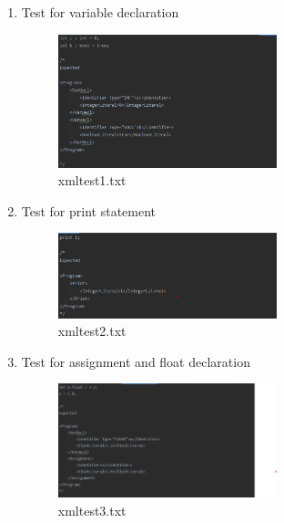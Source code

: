 \documentclass{article}
\begin{document}
				\begin{enumerate}
				\item Test for variable declaration
				\begin{figure}[H]
					\centering
			 			\includegraphics[width=0.6\textwidth]{xmltest1.png}
			 			\centering
			  			\caption{xmltest1.txt}
			  			\label{fig:xmltest1}
					\end{figure}
					
				\item Test for print statement
				
				\begin{figure}[H]
					\centering
			 			\includegraphics[width=0.6\textwidth]{xmltest2.png}
			 			\centering
			  			\caption{xmltest2.txt}
			  			\label{fig:xmltest2}
					\end{figure}
					
					\item Test for assignment and float declaration
					
								\begin{figure}[H]
					\centering
			 			\includegraphics[width=0.6\textwidth]{xmltest3.png}
			 			\centering
			  			\caption{xmltest3.txt}
			  			\label{fig:xmltest3}
					\end{figure}
					

\end{enumerate}
\end{document}
